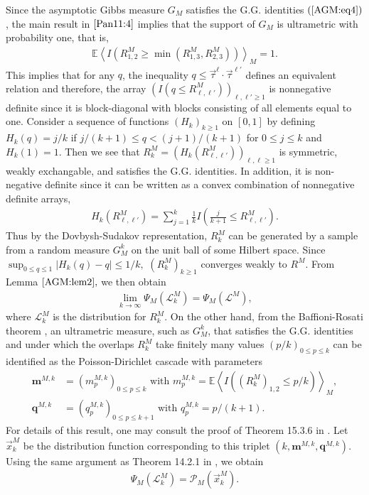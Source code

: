 \documentclass[12pt]{article}
\newcommand{\vtau}{\vec{\tau}}
\newcommand{\vx}{\vec{x}}
\newenvironment{Proof of lemma}{\noindent{\bf Proof of Lemma}}{\hfill$\Box$\newline}
\newenvironment{Proof of theorem}{\noindent{\bf Proof of Theorem}}{\hfill{\footnotesize${\square}$}\newline}
\newenvironment{Proof of theorems}{\noindent{\bf Proof of Theorems}}{\hfill$\Box$\newline}
\newenvironment{Proof of proposition}{\noindent{\bf Proof of Proposition}}{\hfill$\Box$\newline}
\newenvironment{Proof of propositions}{\noindent{\bf Proof of Propositions}}{\hfill$\Box$\newline}
\newenvironment{Proof of exercise}{\noindent{\it Proof of Exercise:}}{\hfill$\Box$}
\numberwithin{equation}{section}
\begin{document}

 Since the asymptotic Gibbs measure $G_M$ satisfies the G.G. identities $(\ref{AGM:eq4})$, the main result in $\cite{Pan11:4}$ implies that the support of $G_M$ is ultrametric with probability one, that is, 
\begin{align*}
\mathbb{E}\left<I(R_{1,2}^M\geq \min(R_{1,3}^M,R_{2,3}^M))\right>_M=1.
\end{align*}
This implies that for any $q$, the inequality $q\leq \vtau^{\ell}\cdot\vtau^{\ell'}$ defines an equivalent relation and therefore, the 
array $(I(q\leq R_{\ell,\ell'}^M))_{\ell,\ell'\geq 1}$ is nonnegative definite since it is block-diagonal with blocks consisting of all elements
equal to one. Consider a sequence of functions $(H_k)_{k\geq 1}$ on $\left[0,1\right]$ by defining $H_{k}(q)=j/k$ if $j/(k+1)\leq q<(j+1)/(k+1)$ for $0\leq j\leq k$ and $H_k(1)=1.$ Then we see that $R_{k}^M=(H_k(R_{\ell,\ell'}^M))_{\ell,\ell\geq 1}$ is symmetric, weakly exchangable, and satisfies the G.G. identities. In addition, it is non-negative definite since it can be written as a convex combination of nonnegative definite arrays,
\begin{align*}
H_k(R_{\ell,\ell'}^M)=\sum_{j=1}^{k}\frac{1}{k}I\left(\frac{j}{k+1}\leq R_{\ell,\ell'}^M\right).
\end{align*}
Thus by the Dovbysh-Sudakov representation, $R_{k}^M$ can be generated by a sample from a random measure $G_M^k$ on the unit ball of some Hilbert space.
Since $\sup_{0\leq q\leq 1}|H_k(q)-q|\leq 1/k,$ $(R_k^M)_{k\geq 1}$ converges weakly to $R^M.$ From Lemma $\ref{AGM:lem2},$ we then obtain
\begin{align}\label{AGMU:add1}
\lim_{k\rightarrow\infty}\Psi_M(\mathcal{L}_k^M)=\Psi_M(\mathcal{L}^M),
\end{align}  
where $\mathcal{L}_k^M$ is the distribution for $R_k^M$. On the other hand, from the Baffioni-Rosati theorem \cite{BR00}, an ultrametric measure, such as $G_M^k$, that satisfies the G.G. identities and under which the overlaps $R_k^M$ take finitely many values $(p/k)_{0\leq p\leq k}$ can be identified as the Poisson-Dirichlet cascade with parameters 
\begin{align*}
\mathbf{m}^{M,k}&=(m_p^{M,k})_{0\leq p\leq k}\,\,\mbox{with $m_p^{M,k}=\mathbb{E}\left<I((R_k^M)_{1,2}\leq p/k)\right>_M,$}\\
\mathbf{q}^{M,k}&=(q_p^{M,k})_{0\leq p\leq k+1}\,\,\mbox{with $q_p^{M,k}=p/(k+1)$}.
\end{align*}
For details of this result, one may consult the proof of Theorem 15.3.6 in \cite{Tal11}. Let $\vx_k^M$ be the distribution function corresponding to this triplet $(k,\mathbf{m}^{M,k},\mathbf{q}^{M,k}).$ Using the same argument as Theorem 14.2.1 in \cite{Tal11}, we obtain
\begin{align}\label{AGM:eq6}
\Psi_M(\mathcal{L}_k^M)=\mathcal{P}_M(\vx_k^M).
\end{align}
\end{document}
